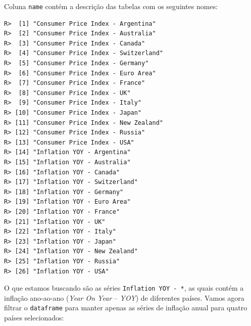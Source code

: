 \documentclass[
  11pt,
]{book}
\newenvironment{Shaded}{\begin{snugshade}}{\end{snugshade}}
\newcommand{\CommentTok}[1]{\textcolor[rgb]{0.37,0.37,0.37}{\textit{#1}}}
\newcommand{\FunctionTok}[1]{\textcolor[rgb]{0,0,0}{#1}}
\newcommand{\NormalTok}[1]{#1}
\newcommand{\OtherTok}[1]{\textcolor[rgb]{0.37,0.37,0.37}{#1}}
\newcommand{\SpecialCharTok}[1]{\textcolor[rgb]{0,0,0}{#1}}
\newcommand{\StringTok}[1]{\textcolor[rgb]{0.5,0.5,0.5}{#1}}
\begin{document}
Coluna \texttt{name} contém a descrição das tabelas com os seguintes nomes:

\begin{Shaded}
\end{Shaded}

\begin{verbatim}
R>  [1] "Consumer Price Index - Argentina"  
R>  [2] "Consumer Price Index - Australia"  
R>  [3] "Consumer Price Index - Canada"     
R>  [4] "Consumer Price Index - Switzerland"
R>  [5] "Consumer Price Index - Germany"    
R>  [6] "Consumer Price Index - Euro Area"  
R>  [7] "Consumer Price Index - France"     
R>  [8] "Consumer Price Index - UK"         
R>  [9] "Consumer Price Index - Italy"      
R> [10] "Consumer Price Index - Japan"      
R> [11] "Consumer Price Index - New Zealand"
R> [12] "Consumer Price Index - Russia"     
R> [13] "Consumer Price Index - USA"        
R> [14] "Inflation YOY - Argentina"         
R> [15] "Inflation YOY - Australia"         
R> [16] "Inflation YOY - Canada"            
R> [17] "Inflation YOY - Switzerland"       
R> [18] "Inflation YOY - Germany"           
R> [19] "Inflation YOY - Euro Area"         
R> [20] "Inflation YOY - France"            
R> [21] "Inflation YOY - UK"                
R> [22] "Inflation YOY - Italy"             
R> [23] "Inflation YOY - Japan"             
R> [24] "Inflation YOY - New Zealand"       
R> [25] "Inflation YOY - Russia"            
R> [26] "Inflation YOY - USA"
\end{verbatim}

O que estamos buscando são as séries \texttt{\textquotesingle{}Inflation\ YOY\ -\ *\textquotesingle{}}, as quais contém a inflação ano-ao-ano (\emph{Year On Year} -- \emph{YOY}) de diferentes países. Vamos agora filtrar o \texttt{dataframe} para manter apenas as séries de inflação anual para quatro países selecionados:

\begin{Shaded}
\end{Shaded}
\end{document}
